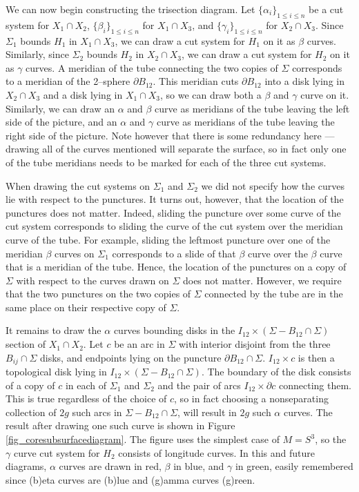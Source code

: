 \documentclass[12pt]{amsart}
\newcommand{\del}{\partial }
\theoremstyle{definition}
\theoremstyle{remark}
\begin{document}
We can now begin constructing the trisection diagram.
Let $\{\alpha_i\}_{1 \le i \le n}$ be a cut system for $X_1 \cap X_2$, $\{\beta_i\}_{1 \le i \le n}$ for $X_1 \cap X_3$, and $\{\gamma_i\}_{1 \le i \le n}$ for $X_2 \cap X_3$.
Since $\Sigma_1$ bounds $H_1$ in $X_1 \cap X_3$, we can draw a cut system for $H_1$ on it as $\beta$ curves.
Similarly, since $\Sigma_2$ bounds $H_2$ in $X_2 \cap X_3$, we can draw a cut system for $H_2$ on it as $\gamma$ curves.
A meridian of the tube connecting the two copies of $\Sigma$ corresponds to a meridian of the 2--sphere $\del B_{12}$.
This meridian cuts $\del B_{12}$ into a disk lying in $X_2 \cap X_3$ and a disk lying in $X_1 \cap X_3$, so we can draw both a $\beta$ and $\gamma$ curve on it.
Similarly, we can draw an $\alpha$ and $\beta$ curve as meridians of the tube leaving the left side of the picture, and an $\alpha$ and $\gamma$ curve as meridians of the tube leaving the right side of the picture.
Note however that there is some redundancy here --- drawing all of the curves mentioned will separate the surface, so in fact only one of the tube meridians needs to be marked for each of the three cut systems.

When drawing the cut systems on $\Sigma_1$ and $\Sigma_2$ we did not specify how the curves lie with respect to the punctures.
It turns out, however, that the location of the punctures does not matter.
Indeed, sliding the puncture over some curve of the cut system corresponds to sliding the curve of the cut system over the meridian curve of the tube.
For example, sliding the leftmost puncture over one of the meridian $\beta$ curves on $\Sigma_1$ corresponds to a slide of that $\beta$ curve over the $\beta$ curve that is a meridian of the tube.
Hence, the location of the punctures on a copy of $\Sigma$ with respect to the curves drawn on $\Sigma$ does not matter.
However, we require that the two punctures on the two copies of $\Sigma$ connected by the tube are in the same place on their respective copy of $\Sigma$.


It remains to draw the $\alpha$ curves bounding disks in the $I_{12} \times (\Sigma - B_{12} \cap \Sigma)$ section of $X_1 \cap X_2$.
 Let $c$ be an arc in $\Sigma$ with interior disjoint from the three $B_{ij} \cap \Sigma$ disks, and endpoints lying on the puncture $\del B_{12} \cap \Sigma$.
$I_{12} \times c$ is then a topological disk lying in $I_{12} \times (\Sigma - B_{12} \cap \Sigma)$.
The boundary of the disk consists of a copy of $c$ in each of $\Sigma_1$ and $\Sigma_2$ and the pair of arcs $I_{12} \times \del c$ connecting them.
This is true regardless of the choice of $c$, so in fact choosing a nonseparating collection of $2g$ such arcs in $\Sigma - B_{12} \cap \Sigma$, will result in $2g$ such $\alpha$ curves.
The result after drawing one such curve is shown in Figure \ref{fig_coresubsurfacediagram}.
The figure uses the simplest case of $M = S^3$, so the $\gamma$ curve cut system for $H_2$ consists of longitude curves.
In this and future diagrams, $\alpha$ curves are drawn in red, $\beta$ in blue, and $\gamma$ in green, easily remembered since (b)eta curves are (b)lue and (g)amma curves (g)reen.
\end{document}
